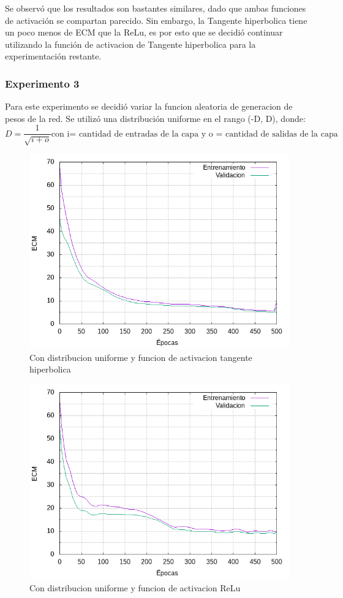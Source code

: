Se observó que los resultados son bastantes similares, dado que ambas funciones de activación se compartan parecido. Sin embargo, la Tangente hiperbolica tiene un poco menos
de ECM que la ReLu, es por esto que se decidió continuar utilizando la función de activacion de Tangente hiperbolica para la experimentación restante.

\subsubsection{Experimento 3}
Para este experimento se decidió variar la funcion aleatoria de generacion de pesos de la red. Se utilizó una distribución uniforme en el rango (-D, D), donde:
\begin{equation}
  D = \frac{1}{\sqrt{i + o}} \mbox{con i= cantidad de entradas de la capa y o = cantidad de salidas de la capa}
\end{equation}

\begin{figure}[H]
  \includegraphics[width=125mm]{imagenes/ej2/ex_3-1_red-9-17-2_errors.png}
  \caption{Con distribucion uniforme y funcion de activacion tangente hiperbolica}
\end{figure}

\begin{figure}[H]
  \includegraphics[width=125mm]{imagenes/ej2/ex_3-2_red-9-17-2_errors.png}
  \caption{Con distribucion uniforme y funcion de activacion ReLu}
\end{figure}
